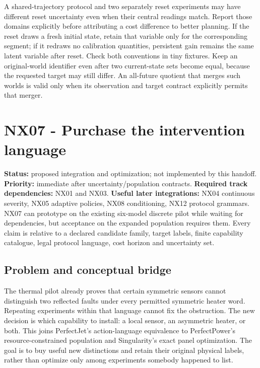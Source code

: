\documentclass[
  11pt,
  a4paper,
]{report}
\begin{document}
A shared-trajectory protocol and two separately reset experiments may
have different reset uncertainty even when their central readings match.
Report those domains explicitly before attributing a cost difference to
better planning. If the reset draws a fresh initial state, retain that
variable only for the corresponding segment; if it redraws no
calibration quantities, persistent gain remains the same latent variable
after reset. Check both conventions in tiny fixtures. Keep an
original-world identifier even after two current-state sets become
equal, because the requested target may still differ. An all-future
quotient that merges such worlds is valid only when its observation and
target contract explicitly permits that merger.

\hypertarget{nx07---purchase-the-intervention-language}{%
\chapter{NX07 - Purchase the intervention
language}\label{nx07---purchase-the-intervention-language}}

\textbf{Status:} proposed integration and optimization; not implemented
by this handoff. \textbf{Priority:} immediate after
uncertainty/population contracts. \textbf{Required track dependencies:}
NX01 and NX03. \textbf{Useful later integrations:} NX04 continuous
severity, NX05 adaptive policies, NX08 conditioning, NX12 protocol
grammars. NX07 can prototype on the existing six-model discrete pilot
while waiting for dependencies, but acceptance on the expanded
population requires them. Every claim is relative to a declared
candidate family, target labels, finite capability catalogue, legal
protocol language, cost horizon and uncertainty set.

\hypertarget{problem-and-conceptual-bridge}{%
\section{Problem and conceptual
bridge}\label{problem-and-conceptual-bridge}}

The thermal pilot already proves that certain symmetric sensors cannot
distinguish two reflected faults under every permitted symmetric heater
word. Repeating experiments within that language cannot fix the
obstruction. The new decision is which capability to install: a local
sensor, an asymmetric heater, or both. This joins PerfectJet's
action-language equivalence to PerfectPower's resource-constrained
population and Singularity's exact panel optimization. The goal is to
buy useful new distinctions and retain their original physical labels,
rather than optimize only among experiments somebody happened to list.
\end{document}

